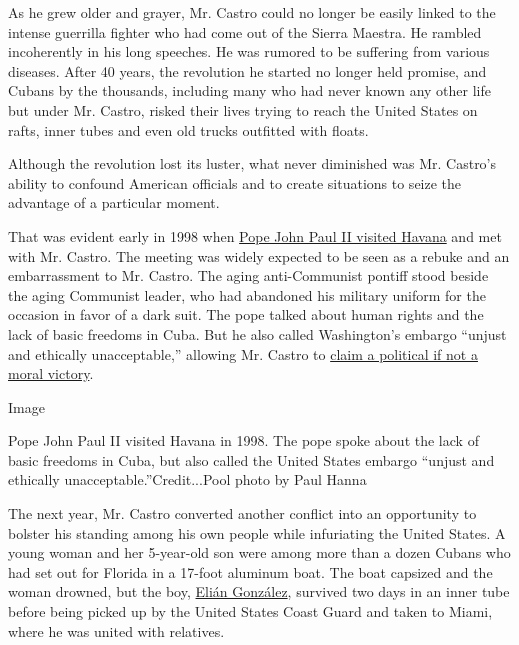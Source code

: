 As he grew older and grayer, Mr. Castro could no longer be easily linked
to the intense guerrilla fighter who had come out of the Sierra Maestra.
He rambled incoherently in his long speeches. He was rumored to be
suffering from various diseases. After 40 years, the revolution he
started no longer held promise, and Cubans by the thousands, including
many who had never known any other life but under Mr. Castro, risked
their lives trying to reach the United States on rafts, inner tubes and
even old trucks outfitted with floats.

Although the revolution lost its luster, what never diminished was Mr.
Castro's ability to confound American officials and to create situations
to seize the advantage of a particular moment.

That was evident early in 1998 when
\href{http://www.nytimes3xbfgragh.onion/1998/01/22/world/the-pope-in-cuba-the-overview-castro-and-cheering-crowds-greet-pope.html}{Pope
John Paul II visited Havana} and met with Mr. Castro. The meeting was
widely expected to be seen as a rebuke and an embarrassment to Mr.
Castro. The aging anti-Communist pontiff stood beside the aging
Communist leader, who had abandoned his military uniform for the
occasion in favor of a dark suit. The pope talked about human rights and
the lack of basic freedoms in Cuba. But he also called Washington's
embargo ``unjust and ethically unacceptable,'' allowing Mr. Castro to
\href{http://www.nytimes3xbfgragh.onion/1998/01/22/world/the-pope-in-cuba-the-implications-castro-s-spin-pope-is-on-our-side.html}{claim
a political if not a moral victory}.

Image

Pope John Paul II visited Havana in 1998. The pope spoke about the lack
of basic freedoms in Cuba, but also called the United States embargo
``unjust and ethically unacceptable.''Credit...Pool photo by Paul Hanna

The next year, Mr. Castro converted another conflict into an opportunity
to bolster his standing among his own people while infuriating the
United States. A young woman and her 5-year-old son were among more than
a dozen Cubans who had set out for Florida in a 17-foot aluminum boat.
The boat capsized and the woman drowned, but the boy,
\href{http://topics.nytimes3xbfgragh.onion/top/reference/timestopics/people/g/elian_gonzalez/index.html?8qa}{Elián
González}, survived two days in an inner tube before being picked up by
the United States Coast Guard and taken to Miami, where he was united
with relatives.

